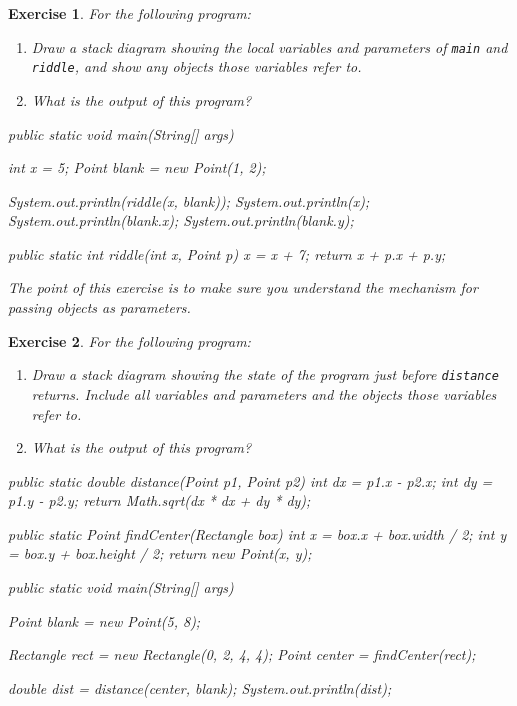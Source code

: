 \documentclass[12pt]{book}
\theoremstyle{exercise}
\newtheorem{exercise}{Exercise}[chapter]
\newcommand{\java}[1]{\verb"#1"}
\newcommand{\java}[1]{\lstinline{#1}} %
\begin{document}
\begin{exercise}
For the following program:

\begin{enumerate}

\item Draw a stack diagram showing the local variables and parameters of \java{main} and \java{riddle}, and show any objects those variables refer to.

\item What is the output of this program?

\end{enumerate}

\begin{code}
    public static void main(String[] args) {
        int x = 5;
        Point blank = new Point(1, 2);

        System.out.println(riddle(x, blank));
        System.out.println(x);
        System.out.println(blank.x);
        System.out.println(blank.y);
    }

    public static int riddle(int x, Point p) {
        x = x + 7;
        return x + p.x + p.y;
    }
\end{code}

The point of this exercise is to make sure you understand the mechanism for passing objects as parameters.
\end{exercise}

\newpage

\begin{exercise}
For the following program:

\begin{enumerate}

\item Draw a stack diagram showing the state of the program just before \java{distance} returns.
Include all variables and parameters and the objects those variables refer to.

\item What is the output of this program?

\end{enumerate}

\begin{code}
    public static double distance(Point p1, Point p2) {
        int dx = p1.x - p2.x;
        int dy = p1.y - p2.y;
        return Math.sqrt(dx * dx + dy * dy);
    }

    public static Point findCenter(Rectangle box) {
        int x = box.x + box.width / 2;
        int y = box.y + box.height / 2;
        return new Point(x, y);
    }

    public static void main(String[] args) {
        Point blank = new Point(5, 8);

        Rectangle rect = new Rectangle(0, 2, 4, 4);
        Point center = findCenter(rect);

        double dist = distance(center, blank);
        System.out.println(dist);
    }
\end{code}

\end{exercise}
\end{document}
